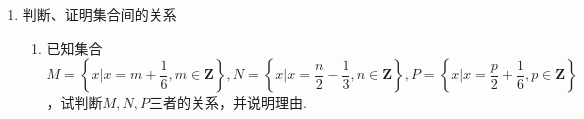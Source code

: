\begin{enumerate}
\begin{enumerate}
\begin{jieda}
\begin{enumerate}
                \item $\left\{0,1,4\right\}$
                \item $\left\{(0,0), (1,1), (-1,1), (1, -1), (-1,-1), (0, 1), (0, -1), (1, 0), (-1, 0)\right\}$
            \end{enumerate}
        \end{jieda}
        \item 用描述法表示下列集合：
        \begin{enumerate}
            \item 被3除余1的所有自然数组成的集合；
            \item 比1大又比10小的所有实数组成的集合；
            \item 平面直角坐标系中坐标轴上所有点组成的集合.
        \end{enumerate}
        \begin{jieda}
            \begin{enumerate}
                \item $\left\{x | x = 3n+1, n \in \mathbf{N} \right\}$
                \item $\left\{x |1 < x < 10 \right\}$
                \item $\left\{(x, y) | xy = 0\right\}$
            \end{enumerate}
        \end{jieda}
        \item 用适当的符合填空：
        \begin{enumerate}
            \item  $\varnothing$ \blkda{=} $ \left\{x \in \mathbf{R} | x^2 + x + 1 = 0\right\}$
            \item $\left\{x | x = 4m -1, m \in \mathbf{Z}\right\}$ \blkda{$\subset$}  $\left\{x | x = 2n + 1, n \in \mathbf{Z}\right\}$
            \item $\left\{y | |x| + |y| = 1\right\}$  \blkda{$=$}  $\left\{y | x^2 + y^2 \leq 1\right\}$
            \item $\left\{y | y = x^2-4x+3 \right\}$   \blkda{$=$}   $\left\{y | y = x^2-1\right\}$
        \end{enumerate}
    \end{enumerate}
    \item 判断、证明集合间的关系
    \begin{enumerate}
        \item 已知集合$M = \left\{x | x = m + \dfrac{1}{6}, m \in \mathbf{Z}\right\}, N = \left\{x | x = \dfrac{n}{2} - \dfrac{1}{3}, n \in \mathbf{Z}\right\}, P = \left\{x | x = \dfrac{p}{2} + \dfrac{1}{6}, p \in \mathbf{Z}\right\}$，试判断$M, N, P$三者的关系，并说明理由.

\end{enumerate}
\end{enumerate}
